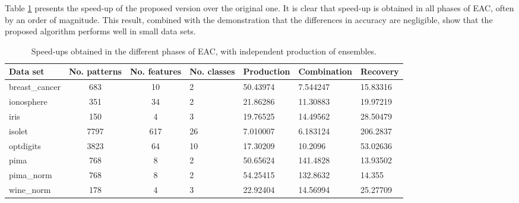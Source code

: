 
Table \ref{tab:validation speedup all} presents the speed-up of the proposed version over the original one.
It is clear that speed-up is obtained in all phases of EAC, often by an order of magnitude.
This result, combined with the demonstration that the differences in accuracy are negligible, show that the proposed algorithm performs well in small data sets.

\begin{table}[h]
\centering
\caption{Speed-ups obtained in the different phases of EAC, with independent production of ensembles.}

\begin{tabular}{lccllll}
\toprule
Data set &  No. patterns &  No. features & No. classes & Production & Combination & Recovery \\
\midrule
breast\_cancer &           683 &            10 &           2 &      50.43974 &   7.544247 &        15.83316 \\
ionosphere    &           351 &            34 &           2 &      21.86286 &   11.30883 &        19.97219 \\
iris          &           150 &             4 &           3 &      19.76525 &   14.49562 &        28.50479 \\
isolet        &          7797 &           617 &          26 &      7.010007 &   6.183124 &        206.2837 \\
optdigits     &          3823 &            64 &          10 &      17.30209 &    10.2096 &        53.02636 \\
pima          &           768 &             8 &           2 &      50.65624 &   141.4828 &        13.93502 \\
pima\_norm     &           768 &             8 &           2 &      54.25415 &   132.8632 &          14.355 \\
wine\_norm     &           178 &             4 &           3 &      22.92404 &   14.56994 &        25.27709 \\
\bottomrule
\end{tabular}

\label{tab:validation speedup all}
\end{table}


